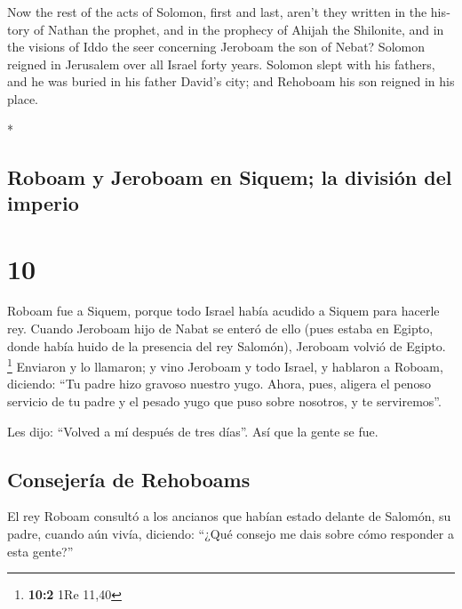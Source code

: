 \begin{paracol}{2}
\begin{otherlanguage}{english}
 Now the rest of the acts of Solomon, first and last,
aren't they written in the history of Nathan the prophet, and in the
prophecy of Ahijah the Shilonite, and in the visions of Iddo the seer
concerning Jeroboam the son of Nebat?  Solomon reigned in
Jerusalem over all Israel forty years.  Solomon slept
with his fathers, and he was buried in his father David's city; and
Rehoboam his son reigned in his place.

\end{otherlanguage}

\switchcolumn[0]*

\hypertarget{roboam-y-jeroboam-en-siquem-la-divisiuxf3n-del-imperio}{%
\subsection{Roboam y Jeroboam en Siquem; la división del
imperio}\label{roboam-y-jeroboam-en-siquem-la-divisiuxf3n-del-imperio}}

\hypertarget{section-18}{%
\section{10}\label{section-18}}

 Roboam fue a Siquem, porque todo Israel había acudido a
Siquem para hacerle rey.  Cuando Jeroboam hijo de Nabat se
enteró de ello (pues estaba en Egipto, donde había huido de la presencia
del rey Salomón), Jeroboam volvió de Egipto. \footnote{\textbf{10:2} 1Re
  11,40}  Enviaron y lo llamaron; y vino Jeroboam y todo
Israel, y hablaron a Roboam, diciendo:  ``Tu padre hizo
gravoso nuestro yugo. Ahora, pues, aligera el penoso servicio de tu
padre y el pesado yugo que puso sobre nosotros, y te serviremos''.

 Les dijo: ``Volved a mí después de tres días''. Así que
la gente se fue.

\hypertarget{consejeruxeda-de-rehoboams}{%
\subsection{Consejería de Rehoboams}\label{consejeruxeda-de-rehoboams}}

 El rey Roboam consultó a los ancianos que habían estado
delante de Salomón, su padre, cuando aún vivía, diciendo: ``¿Qué consejo
me dais sobre cómo responder a esta gente?''


\end{paracol}
